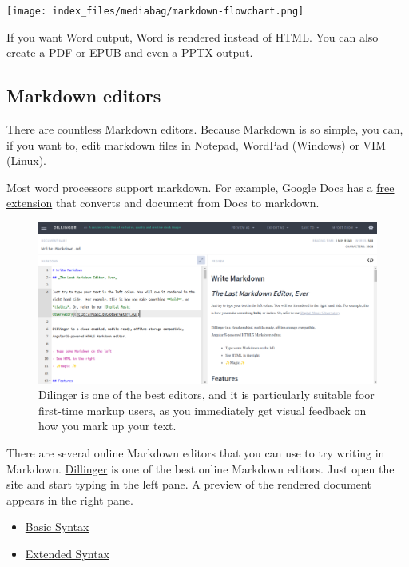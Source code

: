 \documentclass[
  letterpaper,
  DIV=11,
  numbers=noendperiod]{scrreprt}
\providecommand{\tightlist}{%
  \setlength{\itemsep}{0pt}\setlength{\parskip}{0pt}}\usepackage{longtable,booktabs,array}
\begin{document}
\begin{center}
\texttt{[image: index\_files/mediabag/markdown-flowchart.png]}
\end{center}

If you want Word output, Word is rendered instead of HTML. You can also
create a PDF or EPUB and even a PPTX output.

\subsection{Markdown editors}\label{markdown-editors}

There are countless Markdown editors. Because Markdown is so simple, you
can, if you want to, edit markdown files in Notepad, WordPad (Windows)
or VIM (Linux).

Most word processors support markdown. For example, Google Docs has a
\href{https://workspace.google.com/marketplace/app/docs_to_markdown/700168918607}{free
extension} that converts and document from Docs to markdown.

\begin{figure}[H]

{\centering \includegraphics{png/dilliger_example.png}

}

\caption{Dilinger is one of the best editors, and it is particularly
suitable foor first-time markup users, as you immediately get visual
feedback on how you mark up your text.}

\end{figure}%

There are several online Markdown editors that you can use to try
writing in Markdown. \href{https://dillinger.io/}{Dillinger} is one of
the best online Markdown editors. Just open the site and start typing in
the left pane. A preview of the rendered document appears in the right
pane.

\begin{itemize}
\tightlist
\item
  \href{https://www.markdownguide.org/basic-syntax/}{Basic Syntax}
\item
  \href{https://www.markdownguide.org/extended-syntax/}{Extended Syntax}
\end{itemize}
\end{document}

